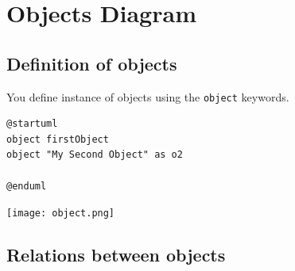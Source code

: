 %
%
% 
%
%
%
%
%
% 

\section{Objects Diagram}

\subsection{Definition of objects}

You define instance of objects using the \texttt{object} keywords.

\begin{lstlisting}
@startuml
object firstObject
object "My Second Object" as o2

@enduml
\end{lstlisting}
\begin{center}
\texttt{[image: object.png]}
\end{center}

\subsection{Relations between objects}


